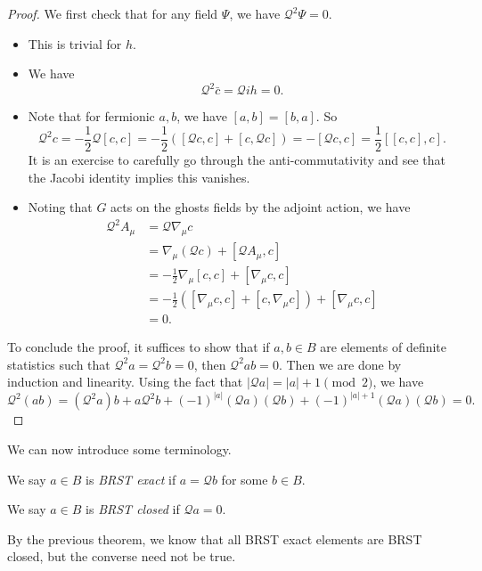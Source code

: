 \documentclass[a4paper]{article}
\begin{document}
\begin{proof}
  We first check that for any field $\Psi$, we have $\mathcal{Q}^2 \Psi = 0$.
  \begin{itemize}
    \item This is trivial for $h$.
    \item We have
      \[
        \mathcal{Q}^2 \bar{c} = \mathcal{Q}i h = 0.
      \]
    \item Note that for fermionic $a, b$, we have $[a, b] = [b, a]$. So
      \[
        \mathcal{Q}^2 c = -\frac{1}{2} \mathcal{Q} [c, c] = -\frac{1}{2} ([\mathcal{Q} c, c] + [c, \mathcal{Q} c]) = -[\mathcal{Q}c, c] = \frac{1}{2} [[c, c], c].
      \]
      It is an exercise to carefully go through the anti-commutativity and see that the Jacobi identity implies this vanishes.
    \item Noting that $G$ acts on the ghosts fields by the adjoint action, we have
      \begin{align*}
        \mathcal{Q}^2 A_\mu &= \mathcal{Q} \nabla_\mu c \\
        &= \nabla_\mu (\mathcal{Q} c) + [\mathcal{Q} A_\mu, c]\\
        &= - \frac{1}{2} \nabla_\mu [c, c] + [\nabla_\mu c, c]\\
        &= - \frac{1}{2} ([\nabla_\mu c, c] + [c, \nabla_\mu c]) + [\nabla_\mu c, c]\\
        &= 0.
      \end{align*}
  \end{itemize}
  To conclude the proof, it suffices to show that if $a, b \in B$ are elements of definite statistics such that $\mathcal{Q}^2 a = \mathcal{Q}^2 b = 0$, then $\mathcal{Q}^2 ab = 0$. Then we are done by induction and linearity. Using the fact that $|\mathcal{Q} a| = |a| + 1 \pmod 2$, we have
  \[
    \mathcal{Q}^2 (ab) = (\mathcal{Q}^2 a) b + a \mathcal{Q}^2 b + (-1)^{|a|} (\mathcal{Q} a) (\mathcal{Q} b) + (-1)^{|a| + 1} (\mathcal{Q} a) (\mathcal{Q} b) = 0.
  \]
\end{proof}

We can now introduce some terminology.
\begin{defi}
  We say $a \in B$ is \emph{BRST exact} if $a = \mathcal{Q} b$ for some $b \in B$.
\end{defi}

\begin{defi}
  We say $a \in B$ is \emph{BRST closed} if $\mathcal{Q} a = 0$.
\end{defi}
By the previous theorem, we know that all BRST exact elements are BRST closed, but the converse need not be true.
\end{document}
